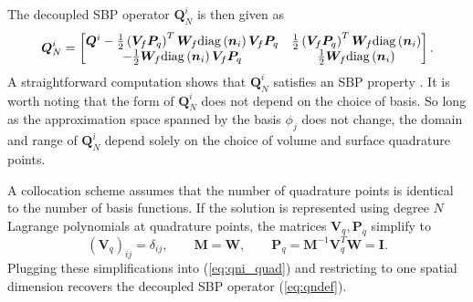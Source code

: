 \documentclass[onefignum,onetabnum,final]{siamart171218}
\newcommand{\LRp}[1]{\left( #1 \right)}
\newcommand{\note}[1]{{\color{blue}{#1}}}
\newcommand{\diag}[1]{{\rm diag}\LRp{#1}}
\begin{document}
The decoupled SBP operator $\bm{Q}_N^i$ is then given as
\begin{equation}
\bm{Q}_N^i = \begin{bmatrix}
\bm{Q}^i - \frac{1}{2}\LRp{\bm{V}_f\bm{P}_q}^T\bm{W}_f \diag{\bm{n}_i}{\bm{V}_f\bm{P}_q} & \frac{1}{2}\LRp{\bm{V}_f\bm{P}_q}^T\bm{W}_f \diag{\bm{n}_i}\\
-\frac{1}{2}\bm{W}_f \diag{\bm{n}_i}{\bm{V}_f\bm{P}_q} & \frac{1}{2}\bm{W}_f \diag{\bm{n}_i}
\end{bmatrix}.
\label{eq:qni_quad}
\end{equation}
A straightforward computation shows that $\bm{Q}_N^i$ satisfies an SBP property \cite{chan2017discretely}.  
It is worth noting that the form of $\bm{Q}_N^i$ does not depend on the choice of basis.  So long as the approximation space spanned by the basis $\phi_j$ does not change, the domain and range of $\bm{Q}_N^i$ depend solely on the choice of volume and surface quadrature points.  

A collocation scheme assumes that the number of quadrature points is identical to the number of basis functions.  If the solution is represented using degree $N$ Lagrange polynomials at quadrature points, the matrices $\bm{V}_q, \bm{P}_q$ simplify to
\[
\LRp{\bm{V}_q}_{ij} = \delta_{ij}, \qquad \bm{M} = \bm{W}, \qquad \bm{P}_q = \bm{M}^{-1}\bm{V}_q^T\bm{W} = \bm{I}.
\]
Plugging these simplifications into (\ref{eq:qni_quad}) and restricting to one spatial dimension recovers the decoupled SBP operator (\ref{eq:qndef}).




\end{document}

